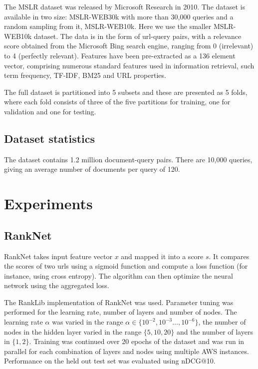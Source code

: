 \documentclass[english]{article}
\theoremstyle{definition}
\begin{document}
\begin{multicols}{2}
The MSLR dataset \cite{DBLP:journals/corr/QinL13} was released by Microsoft Research in 2010.  The dataset is available in two size: MSLR-WEB30k with more than 30,000 queries and a random sampling from it, MSLR-WEB10k.  Here we use the smaller MSLR-WEB10k dataset.  The data is in the form of url-query pairs, with a relevance score obtained from the Microsoft Bing search engine, ranging from 0 (irrelevant) to 4 (perfectly relevant).  Features have been pre-extracted as a 136 element vector, comprising numerous standard features used in information retrieval, such term frequency, TF-IDF, BM25 and URL properties.

The full dataset is partitioned into 5 subsets and these are presented as 5 folds, where each fold consists of three of the five partitions for training, one for validation and one for testing.  

\subsection{Dataset statistics}

The dataset contains 1.2 million document-query pairs.  There are 10,000 queries, giving an average number of documents per query of 120.

\section{Experiments}

\subsection{RankNet}

RankNet takes input feature vector $x$ and mapped it into a score $s$. It compares the scores of two urls using a sigmoid function and compute a loss function (for instance, using cross entropy). The algorithm can then optimize the neural network using the aggregated loss.

The RankLib \cite{Lemur} implementation of RankNet was used.  Parameter tuning was performed for the learning rate, number of layers and number of nodes.  The learning rate $\alpha$ was varied in the range $\alpha \in \{10^{-2},10^{-3} \ldots, 10^{-6}\}$, the number of nodes in the hidden layer varied in the range $\{5, 10, 20\}$ and the number of layers in $\{1, 2\}$.  Training was continued over 20 epochs of the dataset and was run in parallel for each combination of layers and nodes using multiple AWS instances.  Performance on the held out test set was evaluated using nDCG@10. 


\end{multicols}
\end{document}
